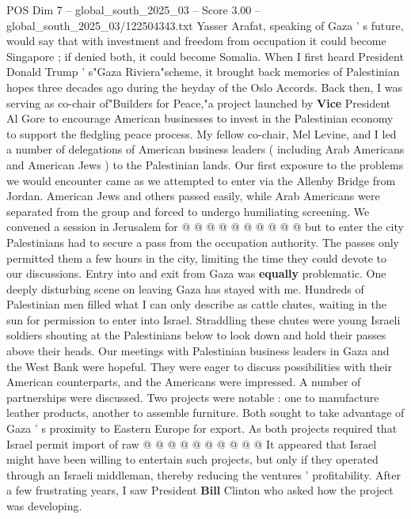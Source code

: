 \begin{textsample}{POS Dim 7 – global\_south\_2025\_03 – Score 3.00 – global\_south\_2025\_03/122504343.txt}  \label{ex:f7_pos_433}
Yasser Arafat, speaking of Gaza ' s future, would say that with investment and freedom from occupation it could become Singapore ; if denied both, it could become Somalia.
When I first heard President Donald Trump ' s"Gaza Riviera"scheme, it brought back memories of Palestinian hopes three decades ago during the heyday of the Oslo Accords.
Back then, I was serving as co-chair of"Builders for Peace,"a project launched by \textbf{Vice} President Al Gore to encourage American businesses to invest in the Palestinian economy to support the fledgling peace process.
My fellow co-chair, Mel Levine, and I led a number of delegations of American business leaders ( including Arab Americans and American Jews ) to the Palestinian lands.
Our first exposure to the problems we would encounter came as we attempted to enter via the Allenby Bridge from Jordan.
American Jews and others passed easily, while Arab Americans were separated from the group and forced to undergo humiliating screening.
We convened a session in Jerusalem for @ @ @ @ @ @ @ @ @ @ but to enter the city Palestinians had to secure a pass from the occupation authority.
The passes only permitted them a few hours in the city, limiting the time they could devote to our discussions.
Entry into and exit from Gaza was \textbf{equally} problematic.
One deeply disturbing scene on leaving Gaza has stayed with me.
Hundreds of Palestinian men filled what I can only describe as cattle chutes, waiting in the sun for permission to enter into Israel.
Straddling these chutes were young Israeli soldiers shouting at the Palestinians below to look down and hold their passes above their heads.
Our meetings with Palestinian business leaders in Gaza and the West Bank were hopeful.
They were eager to discuss possibilities with their American counterparts, and the Americans were impressed.
A number of partnerships were discussed.
Two projects were notable : one to manufacture leather products, another to assemble furniture.
Both sought to take advantage of Gaza ' s proximity to Eastern Europe for export.
As both projects required that Israel permit import of raw @ @ @ @ @ @ @ @ @ @ It appeared that Israel might have been willing to entertain such projects, but only if they operated through an Israeli middleman, thereby reducing the ventures ' profitability.
After a few frustrating years, I saw President \textbf{Bill} Clinton who asked how the project was developing.

\end{textsample}
